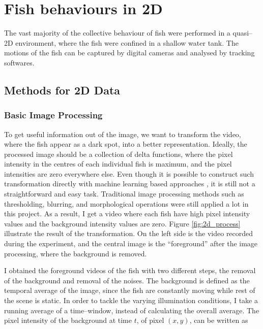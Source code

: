 \documentclass[11pt,twoside]{report}
\begin{document}
\chapter{Fish behaviours in 2D}

The vast majority of the collective behaviour of fish were performed in a quasi--2D environment, where the fish were confined in a shallow water tank. The motions of the fish can be captured by digital cameras and analysed by tracking softwares.

\section{Methods for 2D Data}

\subsection{Basic Image Processing}

To get useful information out of the image, we want to transform the video, where the fish appear as a dark spot, into a better representation. Ideally, the processed image should be a collection of delta functions, where the pixel intensity in the centres of each individual fish is maximum, and the pixel intensities are zero everywhere else. Even though it is possible to construct such transformation directly with machine learning based approaches \cite{newby2018}, it is still not a straightforward and easy task. Traditional image processing methods such as thresholding, blurring, and morphological operations were still applied a lot in this project. As a result, I get a video where each fish have high pixel intensity values and the background intensity values are zero. Figure \ref{fig:2d_process} illustrate the result of the transformation. On the left side is the video recorded during the experiment, and the central image is the ``foreground'' after the image processing, where the background is removed.

I obtained the foreground videos of the fish with two different steps, the removal of the background and removal of the noises. The background is defined as the temporal average of the image, since the fish are constantly moving while rest of the scene is static. In order to tackle the varying illumination conditions, I take a running average of a time--window, instead of calculating the overall average. The pixel intensity of the background at time $t$, of pixel $(x, y)$, can be written as
\end{document}
